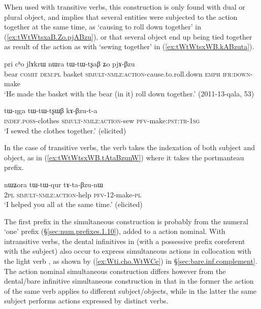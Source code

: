  When used with transitive verbs, this construction is only found with dual or plural object, and implies that several entities were subjected to the action together at the same time, as  `causing to roll down together' in (\ref{ex:tWtWtsxaB.Zo.pjABzu}), or that several object end up being tied together as result of the action as with  `sewing together' in (\ref{ex:tWtWtsxWB.kABzuta}).
 
\begin{exe}
\ex \label{ex:tWtWtsxaB.Zo.pjABzu}
\gll  pri cʰo jlɤkrɯ nɯra tɯ-tɯ-tʂaβ ʑo pjɤ-βzu  \\
 bear \textsc{comit} \textsc{dem}:\textsc{pl}  basket  \textsc{simult}-\textsc{nmlz}:\textsc{action}-cause.to.roll.down \textsc{emph} \textsc{ifr}:\textsc{down}-make \\
\glt `He made the basket with the bear (in it) roll down together.' (2011-13-qala, 53) 
\end{exe}

\begin{exe}
\ex \label{ex:tWtWtsxWB.kABzuta}
\gll   tɯ-ŋga tɯ-tɯ-tʂɯβ kɤ-βzu-t-a \\
\textsc{indef}.\textsc{poss}-clothes \textsc{simult}-\textsc{nmlz}:\textsc{action}-sew \textsc{pfv}-make:\textsc{pst}:\textsc{tr}-\textsc{1sg} \\
\glt `I sewed the clothes together.' (elicited)
\end{exe}

In the case of transitive verbs, the verb  takes the indexation of both subject and object, as in (\ref{ex:tWtWtsxWB.tAtaBzunW}) where it takes the portmanteau  prefix.

\begin{exe}
\ex \label{ex:tWtWtsxWB.tAtaBzunW}
\gll nɯʑora tɯ-tɯ-qur tɤ-ta-βzu-nɯ \\
\textsc{2pl} \textsc{simult}-\textsc{nmlz}:\textsc{action}-help \textsc{pfv}-1\fl{}2-make-\textsc{pl} \\
\glt `I helped you all at the same time.' (elicited)
\end{exe}  

The first  prefix in the simultaneous construction is probably from the numeral  `one' prefix (§\ref{sec:num.prefixes.1.10}), added to a  action nominal. With intransitive verbs, the dental infinitives in  (with a possessive prefix coreferent with the subject) also occur to express simultaneous actions in collocation with the light verb , as shown by (\ref{ex:Wti.cho.WtWCe}) in §\ref{sec:bare.inf.complement}. The action nominal simultaneous construction differs however from the dental/bare infinitive simultaneous construction in that in the former the action of the same verb applies to different subject/objects, while in the latter the same subject performs actions expressed by distinct verbs.


